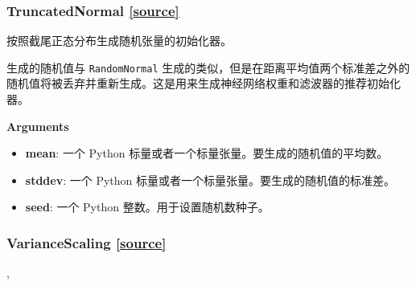 \subsubsection{TruncatedNormal {\href{https://github.com/keras-team/keras/blob/master/keras/initializers.py\#L122}{{[}source{]}}}}

\begin{Shaded}
\begin{Highlighting}[]
\OperatorTok{=}\OperatorTok{=}\OperatorTok{=}\NormalTok{)}
\end{Highlighting}
\end{Shaded}

按照截尾正态分布生成随机张量的初始化器。

生成的随机值与 \texttt{RandomNormal}
生成的类似，但是在距离平均值两个标准差之外的随机值将被丢弃并重新生成。这是用来生成神经网络权重和滤波器的推荐初始化器。

\textbf{Arguments}

\begin{itemize}
\tightlist
\item
  \textbf{mean}: 一个 Python
  标量或者一个标量张量。要生成的随机值的平均数。
\item
  \textbf{stddev}: 一个 Python
  标量或者一个标量张量。要生成的随机值的标准差。
\item
  \textbf{seed}: 一个 Python 整数。用于设置随机数种子。
\end{itemize}




\subsubsection{VarianceScaling {\href{https://github.com/keras-team/keras/blob/master/keras/initializers.py\#L155}{{[}source{]}}}}

\begin{Shaded}
\begin{Highlighting}[]
\OperatorTok{=}\OperatorTok{=}\OperatorTok{=},\\
\hspace{3cm}\OperatorTok{=}\NormalTok{)}
\end{Highlighting}
\end{Shaded}

